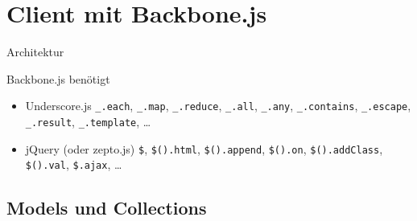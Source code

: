 \section[Client]{Client mit Backbone.js}

\begin{Frame}{Architektur}
  \begin{center}
    
  \end{center}
\end{Frame}

\begin{Frame}{Backbone.js benötigt}
  \begin{itemize}
    \item Underscore.js \newline
      \lstinline-_.each-, \lstinline-_.map-,
      \lstinline-_.reduce-, \newline
      \lstinline-_.all-, \lstinline-_.any-, \lstinline-_.contains-, \newline
      \lstinline-_.escape-, \lstinline-_.result-, \lstinline-_.template-,
      \ldots
  \end{itemize}
  
  
  \begin{itemize}
    \item jQuery (oder zepto.js) \newline
      \lstinline-$-, \lstinline-$().html-,
      \lstinline-$().append-, \newline
      \lstinline-$().on-, \lstinline-$().addClass-, \lstinline-$().val-, \newline
      \lstinline-$.ajax-, \ldots
  \end{itemize}
\end{Frame}

\subsection{Models und Collections}

